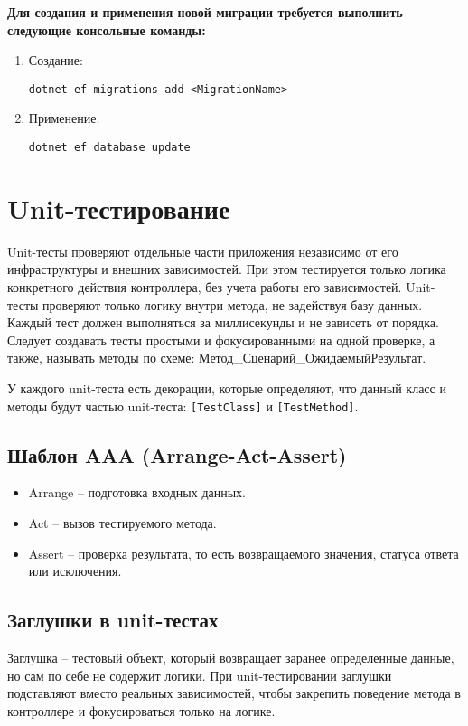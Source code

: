 \documentclass[a4paper,12pt]{report}
\begin{document}
\textbf{Для создания и применения новой миграции требуется выполнить следующие консольные команды:}
\begin{enumerate}
    \item
        Создание:

        \texttt{dotnet ef migrations add <MigrationName>}
    \item
        Применение:

        \texttt{dotnet ef database update}
\end{enumerate}

\section{Unit-тестирование}

Unit-тесты проверяют отдельные части приложения независимо от его инфраструктуры и внешних зависимостей. 
При этом тестируется только логика конкретного действия контроллера, без учета работы его зависимостей.
Unit-тесты проверяют только логику внутри метода, не задействуя базу данных. Каждый тест должен выполняться 
за миллисекунды и не зависеть от порядка. Следует создавать тесты простыми и фокусированными на одной проверке, 
а также, называть методы по схеме: Метод\_Сценарий\_ОжидаемыйРезультат.

У каждого unit-теста есть декорации, которые определяют, что данный класс и методы будут частью unit-теста: 
\texttt{[TestClass]} и \texttt{[TestMethod]}.

\subsection{Шаблон AAA (Arrange-Act-Assert)}
\begin{itemize}
    \item
        Arrange -- подготовка входных данных.
    \item
        Act -- вызов тестируемого метода.
    \item
        Assert -- проверка результата, то есть возвращаемого значения, статуса ответа или исключения.
\end{itemize}

\subsection{Заглушки в unit-тестах}
Заглушка -- тестовый объект, который возвращает заранее определенные данные, 
но сам по себе не содержит логики. При unit-тестировании заглушки подставляют вместо реальных зависимостей, 
чтобы закрепить поведение метода в контроллере и фокусироваться только на логике.
\end{document}
